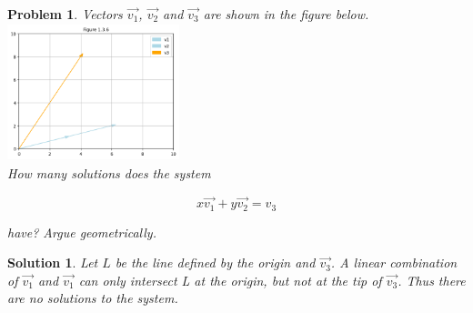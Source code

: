 \documentclass{article}
\newtheorem{problem}{Problem}
\newtheorem*{solution}{Solution}
\begin{document}
\begin{problem}
Vectors $\vec{v_{1}}$, $\vec{v_{2}}$ and $\vec{v_{3}}$ are shown in the figure below. \\

\includegraphics[width=5cm, height=4cm]{problem1.3.6} \\

How many solutions does the system

\begin{equation*}
x\vec{v_{1}} + y\vec{v_{2}} = v_{3}
\end{equation*}

have? Argue geometrically.
\end{problem}

\begin{solution}
Let $L$ be the line defined by the origin and $\vec{v_{3}}$. A linear combination of $\vec{v_{1}}$ and $\vec{v_{1}}$ can only intersect L at the origin, but not at the tip of $\vec{v_{3}}$. Thus there are no solutions to the system.
\end{solution}
\end{document}
